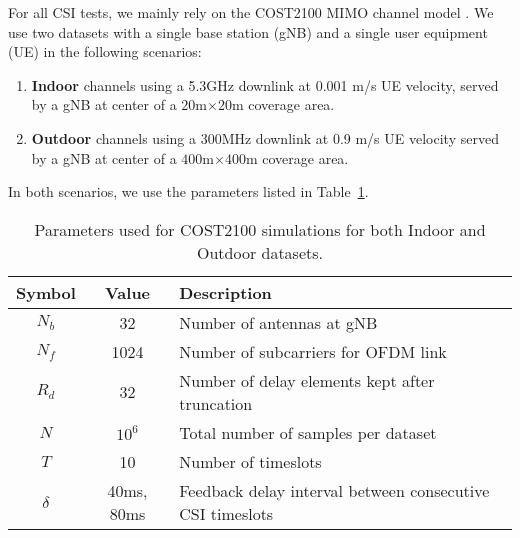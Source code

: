 For all CSI tests, we mainly rely on the COST2100 MIMO channel model \cite{ref:liu2012cost2100}. We use two datasets with a single base station (gNB) and a single user equipment (UE) in the following scenarios:
\begin{enumerate}
	\item \textbf{Indoor} channels using a 5.3GHz downlink at
	0.001 m/s UE velocity, served by a
	gNB at center of a $20$m$\times 20$m coverage area.
	\item \textbf{Outdoor} channels using a 300MHz downlink at 0.9 m/s UE velocity served by a gNB at center 
	of a $400$m$\times 400$m coverage area.
\end{enumerate}
In both scenarios, we use the parameters listed in Table~\ref{tab:cost-params}.
\begin{table}[]
\centering
\caption{Parameters used for COST2100 simulations for both Indoor and Outdoor datasets.}
\label{tab:cost-params}
\begin{tabular}{c|c|l}
\toprule
\textbf{Symbol} & \textbf{Value} & \textbf{Description} \\ \midrule
$N_b$ 			& 32			 & Number of antennas at gNB  \\ \hline
$N_f$ 			& 1024			 & Number of subcarriers for OFDM link  \\ \hline
$R_d$ 			& 32			 & Number of delay elements kept after truncation  \\ \hline
$N$ 			& $10^6$		 & Total number of samples per dataset  \\ \hline
$T$ 			& 10		 	 & Number of timeslots  \\ \hline
$\delta$		& 40ms, 80ms	 & Feedback delay interval between consecutive CSI timeslots  \\ \bottomrule
\end{tabular}
\end{table}
